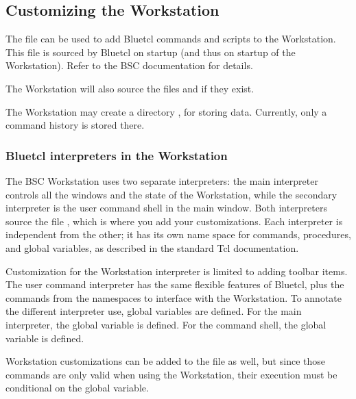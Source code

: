 
\subsection{Customizing the Workstation}

The file  can be used to add Bluetcl commands
and scripts to the Workstation.  This file is sourced by Bluetcl on
startup (and thus on startup of the Workstation).  Refer to the BSC
documentation for details.

The Workstation will also source the files 
and  if they exist.

The Workstation may create a directory , for storing
data.  Currently, only a command history is stored there.


\subsubsection{Bluetcl interpreters in the Workstation}

The BSC Workstation uses two separate interpreters: the main
interpreter controls all the windows and the state of the Workstation,
while the secondary interpreter is
the user command shell in the main window.  Both interpreters source the file
, which is where you add  your customizations.
Each interpreter is independent from the other; it has its own name
space for commands, procedures, and global variables, as described in
the standard Tcl documentation.  

Customization for the Workstation interpreter is limited to  adding
toolbar items.  The user  command interpreter
has the same flexible features of Bluetcl, plus the commands from the
 namespaces to interface with the Workstation.  To annotate the
different interpreter use,  global variables are defined.  For the
main interpreter, the global variable  is defined.  For the
command shell, the global variable  is defined.

Workstation customizations can be added to the  file as
well, but since those commands are only valid when using the
Workstation, their execution must be conditional on the global variable.


